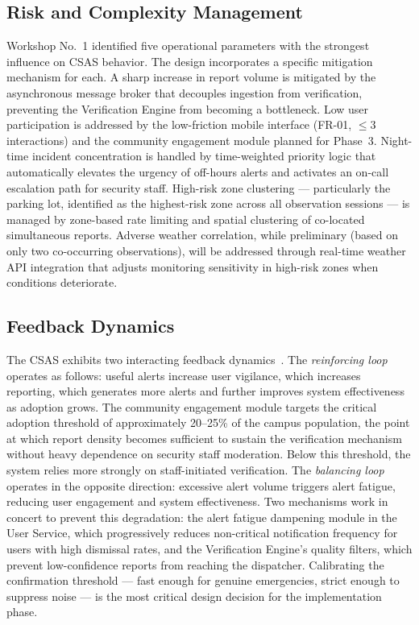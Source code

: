 \documentclass[12pt, oneside]{article}
\begin{document}
\subsection{Risk and Complexity Management}

Workshop No.~1 identified five operational parameters with the strongest influence on
CSAS behavior. The design incorporates a specific mitigation mechanism for each.
A sharp increase in report volume is mitigated by the asynchronous message broker
that decouples ingestion from verification, preventing the Verification Engine from
becoming a bottleneck. Low user participation is addressed by the low-friction mobile
interface (FR-01, $\leq$3 interactions) and the community engagement module planned
for Phase~3. Night-time incident concentration is handled by time-weighted priority
logic that automatically elevates the urgency of off-hours alerts and activates an
on-call escalation path for security staff. High-risk zone clustering --- particularly
the parking lot, identified as the highest-risk zone across all observation sessions ---
is managed by zone-based rate limiting and spatial clustering of co-located simultaneous
reports. Adverse weather correlation, while preliminary (based on only two co-occurring
observations), will be addressed through real-time weather API integration that adjusts
monitoring sensitivity in high-risk zones when conditions deteriorate.

\subsection{Feedback Dynamics}

The CSAS exhibits two interacting feedback dynamics~\cite{meadows2008}. The
\textit{reinforcing loop} operates as follows: useful alerts increase user vigilance,
which increases reporting, which generates more alerts and further improves system
effectiveness as adoption grows. The community engagement module targets the critical
adoption threshold of approximately 20--25\% of the campus population, the point at
which report density becomes sufficient to sustain the verification mechanism without
heavy dependence on security staff moderation. Below this threshold, the system relies
more strongly on staff-initiated verification. The \textit{balancing loop} operates in
the opposite direction: excessive alert volume triggers alert fatigue, reducing user
engagement and system effectiveness. Two mechanisms work in concert to prevent this
degradation: the alert fatigue dampening module in the User Service, which progressively
reduces non-critical notification frequency for users with high dismissal rates, and the
Verification Engine's quality filters, which prevent low-confidence reports from reaching
the dispatcher. Calibrating the confirmation threshold --- fast enough for genuine
emergencies, strict enough to suppress noise --- is the most critical design decision
for the implementation phase.
\end{document}
